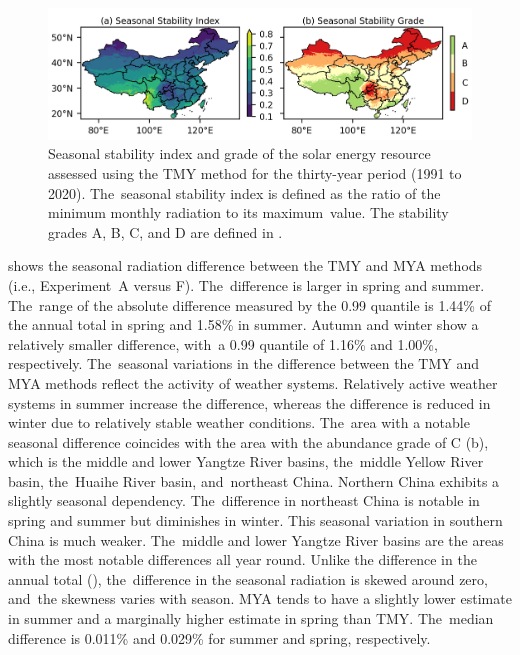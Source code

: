 \documentclass[atmosphere,article,accept,pdftex,moreauthors]{Definitions/mdpi}
\begin{document}
\begin{figure}[H]
  \includegraphics[width=13.8cm]{fig/tmy-seasonal-stability-index-grade.png}
  \caption{Seasonal stability index and grade of the solar energy resource assessed using the TMY method for the thirty-year period (1991 to 2020). The~seasonal stability index is defined as the ratio of the minimum monthly radiation to its maximum~value. The stability grades A, B, C, and D are defined in . \label{fig:stability_grade}}
\end{figure}

 shows the seasonal radiation difference between the TMY and MYA methods (i.e., Experiment~A versus F). The~difference is larger in spring and summer. The~range of the absolute difference measured by the 0.99 quantile is 1.44\% of the annual total in spring and 1.58\% in summer. Autumn and winter show a relatively smaller difference, with~a 0.99 quantile of 1.16\% and 1.00\%, respectively. The~seasonal variations in the difference between the TMY and MYA methods reflect the activity of weather systems. Relatively active weather systems in summer increase the difference, whereas the difference is reduced in winter due to relatively stable weather conditions. The~area with a notable seasonal difference coincides with the area with the abundance grade of C (b), which is the middle and lower Yangtze River basins, the~middle Yellow River basin, the~Huaihe River basin, and~northeast China. Northern China exhibits a slightly seasonal dependency. The~difference in northeast China is notable in spring and summer but diminishes in winter. This seasonal variation in southern China is much weaker. The~middle and lower Yangtze River basins are the areas with the most notable differences all year round. Unlike the difference in the annual total (), the~difference in the seasonal radiation is skewed around zero, and~the skewness varies with season. MYA tends to have a slightly lower estimate in summer and a marginally higher estimate in spring than TMY\@. The~median difference is \textminus{}0.011\% and 0.029\% for summer and spring, respectively.
\end{document}
